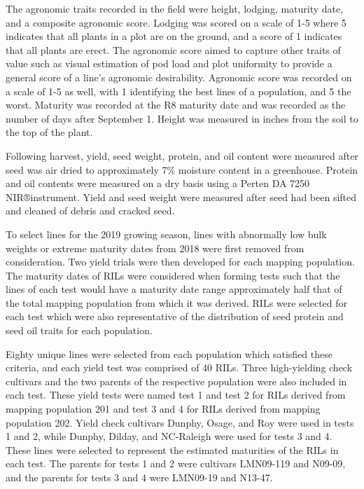 \documentclass[Agronomy,article,submit,moreauthors,pdftex]{mdpi}
\begin{document}
The agronomic traits recorded in the field were height, lodging,
maturity date, and a composite agronomic score. Lodging was scored on a
scale of 1-5 where 5 indicates that all plants in a plot are on the
ground, and a score of 1 indicates that all plants are
erect\citep{fehr1987soybeans}. The agronomic score aimed to capture
other traits of value such as visual estimation of pod load and plot
uniformity to provide a general score of a line's agronomic
desirability. Agronomic score was recorded on a scale of 1-5 as well,
with 1 identifying the best lines of a population, and 5 the worst.
Maturity was recorded at the R8 maturity date and was recorded as the
number of days after September 1. Height was measured in inches from the
soil to the top of the plant.

Following harvest, yield, seed weight, protein, and oil content were
measured after seed was air dried to approximately 7\% moisture content
in a greenhouse. Protein and oil contents were measured on a dry basis
using a Perten DA 7250 NIR®instrument. Yield and seed weight were
measured after seed had been sifted and cleaned of debris and cracked
seed.

To select lines for the 2019 growing season, lines with abnormally low
bulk weights or extreme maturity dates from 2018 were first removed from
consideration. Two yield trials were then developed for each mapping
population. The maturity dates of RILs were considered when forming
tests such that the lines of each test would have a maturity date range
approximately half that of the total mapping population from which it
was derived. RILs were selected for each test which were also
representative of the distribution of seed protein and seed oil traits
for each population.

Eighty unique lines were selected from each population which satisfied
these criteria, and each yield test was comprised of 40 RILs. Three
high-yielding check cultivars and the two parents of the respective
population were also included in each test. These yield tests were named
test 1 and test 2 for RILs derived from mapping population 201 and test
3 and 4 for RILs derived from mapping population 202. Yield check
cultivars Dunphy, Osage\citep{Osage}, and Roy were used in tests 1 and
2, while Dunphy, Dilday, and NC-Raleigh\citep{NCRaleighregistration}
were used for tests 3 and 4. These lines were selected to represent the
estimated maturities of the RILs in each test. The parents for tests 1
and 2 were cultivars LMN09-119 and N09-09, and the parents for tests 3
and 4 were LMN09-19 and N13-47.
\end{document}
